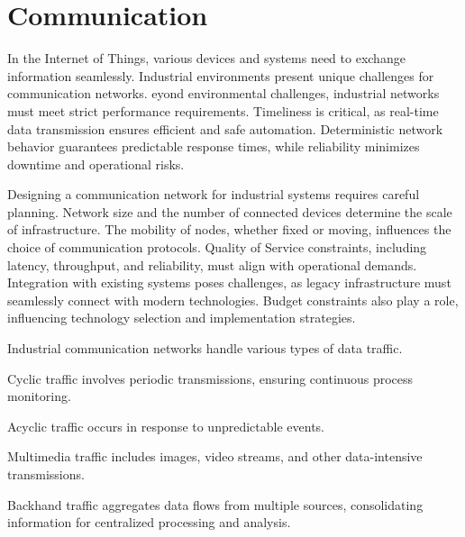 \section{Communication}

In the Internet of Things, various devices and systems need to exchange information seamlessly.
Industrial environments present unique challenges for communication networks.
eyond environmental challenges, industrial networks must meet strict performance requirements. 
Timeliness is critical, as real-time data transmission ensures efficient and safe automation. 
Deterministic network behavior guarantees predictable response times, while reliability minimizes downtime and operational risks.

Designing a communication network for industrial systems requires careful planning. 
Network size and the number of connected devices determine the scale of infrastructure. 
The mobility of nodes, whether fixed or moving, influences the choice of communication protocols. 
Quality of Service constraints, including latency, throughput, and reliability, must align with operational demands. 
Integration with existing systems poses challenges, as legacy infrastructure must seamlessly connect with modern technologies.
Budget constraints also play a role, influencing technology selection and implementation strategies.

Industrial communication networks handle various types of data traffic.
\begin{definition}
    Cyclic traffic involves periodic transmissions, ensuring continuous process monitoring.
\end{definition}
\begin{definition}
    Acyclic traffic occurs in response to unpredictable events. 
\end{definition}
\begin{definition}
    Multimedia traffic includes images, video streams, and other data-intensive transmissions.
\end{definition}
\begin{definition}
    Backhand traffic aggregates data flows from multiple sources, consolidating information for centralized processing and analysis.
\end{definition}

